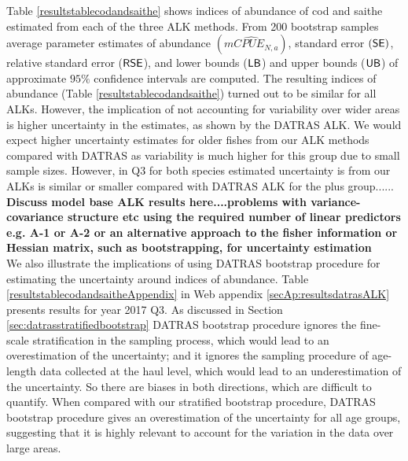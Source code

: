\documentclass[a4paper 12pt]{article}
\numberwithin{equation}{section}
\newcommand{\SE}{\textnormal{\sffamily SE}\xspace}
\newcommand{\RSE}{\textnormal{\sffamily RSE}\xspace}
\newcommand{\LB}{\textnormal{\sffamily LB}\xspace}
\newcommand{\UB}{\textnormal{\sffamily UB}\xspace}
\begin{document}
\clearpage
Table \ref{resultstablecodandsaithe} shows indices of abundance of cod and saithe estimated from each of the three ALK methods. From 200 bootstrap samples average parameter estimates of abundance $(\widehat{mCPUE_{N,a}})$, standard error $(\SE)$, relative standard error ($\RSE$), and lower bounds ($\LB$) and upper bounds ($\UB$) of approximate $95\%$ confidence intervals are computed. The resulting indices of abundance (Table \ref{resultstablecodandsaithe}) turned out to be similar for all ALKs. However, the implication of not accounting for variability over wider areas is higher  uncertainty in the estimates, as shown by the DATRAS ALK. We would expect higher uncertainty estimates for older fishes from our ALK methods compared with DATRAS as variability is much higher for this group due to small sample sizes. However, in Q3 for both species estimated uncertainty is from our ALKs is similar or smaller compared with DATRAS ALK for the plus group......\\

{\bf Discuss model base ALK results here....problems with variance-covariance structure etc using the required number of linear predictors e.g. A-1 or A-2 or an alternative approach to the fisher information or Hessian matrix, such as bootstrapping, for uncertainty estimation}\\

We also illustrate the implications of using DATRAS bootstrap procedure for estimating the uncertainty around indices of abundance. Table \ref{resultstablecodandsaitheAppendix} in Web appendix \ref{secAp:resultsdatrasALK} presents results for year 2017 Q3. As discussed in Section \ref{sec:datrasstratifiedbootstrap} DATRAS bootstrap procedure ignores the fine-scale stratification in the sampling process, which would lead to an overestimation of the uncertainty; and it ignores the sampling procedure of age-length data collected at the haul level, which would lead to an underestimation of the uncertainty. So there are biases in both directions, which are difficult to quantify. When compared with our stratified bootstrap procedure, DATRAS bootstrap procedure gives an overestimation of the uncertainty for all age groups, suggesting that it is highly relevant to account for the variation in the data over large areas. 
\end{document}

